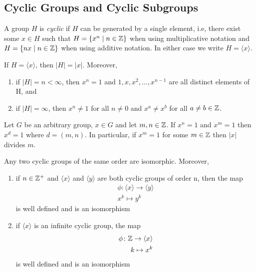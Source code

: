 \documentclass[../main]{subfiles}
\begin{document}
 
 \subsection{Cyclic Groups and Cyclic Subgroups}
 
 
 \begin{dfn}
  A group $H$ is \textit{cyclic} if $H$ can be generated by a single element, i.e, there exist some $x\in H$ such that $H= \{x^n\mid n\in \mathbb{Z}\}$ when using multiplicative notation and $H= \{nx \mid n\in \mathbb{Z}\}$ when using additive notation. In either case we write $H = \langle x \rangle$. 
 \end{dfn}
 
 
 \begin{prop}
  If $H=\langle x\rangle$, then $|H|=|x|$. Moreover,
  \begin{enumerate}
   \item if $|H| = n < \infty $, then $x^n = 1$ and $1,x,x^2,\ldots,x^{n-1}$ are all distinct elements of H, and 
   \item if $|H|= \infty$, then $x^n \neq 1$ for all $n \neq 0$ and $x^a \neq x^b$ for all $a\neq b \in \mathbb{Z}$.
  \end{enumerate}
 \end{prop}
 
 
 \begin{prop}
  Let $G$ be an arbitrary group, $x\in G$ and let $m,n \in \mathbb{Z}$. If $x^n = 1$ and $x^m = 1$ then $x^d = 1$ where $d=(m,n)$. In particular, if $x^m=1$ for some $m\in \mathbb{Z}$ then $|x|$ divides $m$.
 \end{prop}
 
 
 \begin{thm}
  Any two cyclic groups of the same order are isomorphic. Moreover, 
  \begin{enumerate}
   \item if $n\in \mathbb{Z}^+$ and $\langle x \rangle$ and $\langle y \rangle$ are both cyclic groups of order n, then the map
   \begin{align*}
    \phi \colon \langle x \rangle \to \langle y \rangle \\
    x^k \mapsto y^k
   \end{align*}
   is well defined and is an isomorphism
   \item if $\langle x \rangle$ is an infinite cyclic group, the map 
   \begin{align*}
    \phi \colon \mathbb{Z} \to \langle x \rangle \\
    k \mapsto x^k
   \end{align*}
   is well defined and is an isomorphism
  \end{enumerate}
 \end{thm}
\end{document}
